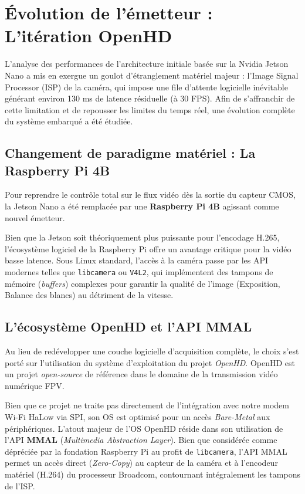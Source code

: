 \section{Évolution de l'émetteur : L'itération OpenHD}

L'analyse des performances de l'architecture initiale basée sur la Nvidia Jetson Nano a mis en exergue un 
goulot d'étranglement matériel majeur : l'Image Signal Processor (ISP) de la caméra, qui impose 
une file d'attente logicielle inévitable générant environ 130 ms de latence résiduelle (à 30 FPS). Afin de 
s'affranchir de cette limitation et de repousser les limites du temps réel, une évolution complète du 
système embarqué a été étudiée.

\subsection{Changement de paradigme matériel : La Raspberry Pi 4B}
Pour reprendre le contrôle total sur le flux vidéo dès la sortie du capteur CMOS, la 
Jetson Nano a été remplacée par une \textbf{Raspberry Pi 4B} agissant comme nouvel 
émetteur. 

Bien que la Jetson soit théoriquement plus puissante pour l'encodage H.265, l'écosystème logiciel de la 
Raspberry Pi offre un avantage critique pour la vidéo basse latence. Sous Linux standard, l'accès à la 
caméra passe par les API modernes telles que \texttt{libcamera} ou \texttt{V4L2}, qui implémentent 
des tampons de mémoire (\textit{buffers}) complexes pour garantir la qualité de l'image (Exposition, Balance 
des blancs) au détriment de la vitesse.

\subsection{L'écosystème OpenHD et l'API MMAL}
Au lieu de redévelopper une couche logicielle d'acquisition complète, le choix s'est porté sur l'utilisation 
du système d'exploitation du projet \textit{OpenHD}. OpenHD est un projet \textit{open-source} 
de référence dans le domaine de la transmission vidéo numérique FPV.

Bien que ce projet ne traite pas directement de l'intégration avec notre modem Wi-Fi HaLow via SPI, son OS 
est optimisé pour un accès \textit{Bare-Metal} aux périphériques. L'atout majeur de l'OS OpenHD réside dans 
son utilisation de l'API \textbf{MMAL} (\textit{Multimedia Abstraction Layer}). 
Bien que considérée comme dépréciée par la fondation Raspberry Pi au profit de \texttt{libcamera}, l'API MMAL 
permet un accès direct (\textit{Zero-Copy}) au capteur de la caméra et à l'encodeur matériel (H.264) du 
processeur Broadcom, contournant intégralement les tampons de l'ISP.

